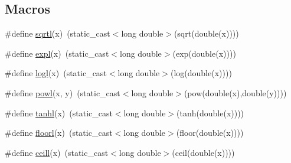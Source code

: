 \subsection*{Macros}
\begin{DoxyCompactItemize}
\item 
\#define \hyperlink{centroidalifold_2contrafold_2_utilities_8ipp_adec5708ea4f27b718663e2a57e73303a}{sqrtl}(x)~(static\+\_\+cast$<$long double$>$(sqrt(double(x))))
\item 
\#define \hyperlink{centroidalifold_2contrafold_2_utilities_8ipp_a3262d247d0e746116959ee487aed42e1}{expl}(x)~(static\+\_\+cast$<$long double$>$(exp(double(x))))
\item 
\#define \hyperlink{centroidalifold_2contrafold_2_utilities_8ipp_af30ed28c10eaaab05f92d1043d458741}{logl}(x)~(static\+\_\+cast$<$long double$>$(log(double(x))))
\item 
\#define \hyperlink{centroidalifold_2contrafold_2_utilities_8ipp_a38ce40625edb986ea847a15a34615cc1}{powl}(x, y)~(static\+\_\+cast$<$long double$>$(pow(double(x),double(y))))
\item 
\#define \hyperlink{centroidalifold_2contrafold_2_utilities_8ipp_a99028516a5b84b8232290731299c72cd}{tanhl}(x)~(static\+\_\+cast$<$long double$>$(tanh(double(x))))
\item 
\#define \hyperlink{centroidalifold_2contrafold_2_utilities_8ipp_a0ea134b0841e1599acca1a6798ef4607}{floorl}(x)~(static\+\_\+cast$<$long double$>$(floor(double(x))))
\item 
\#define \hyperlink{centroidalifold_2contrafold_2_utilities_8ipp_a8bd1d8e6a787be7c41651531bb76e2f8}{ceill}(x)~(static\+\_\+cast$<$long double$>$(ceil(double(x))))
\end{DoxyCompactItemize}
